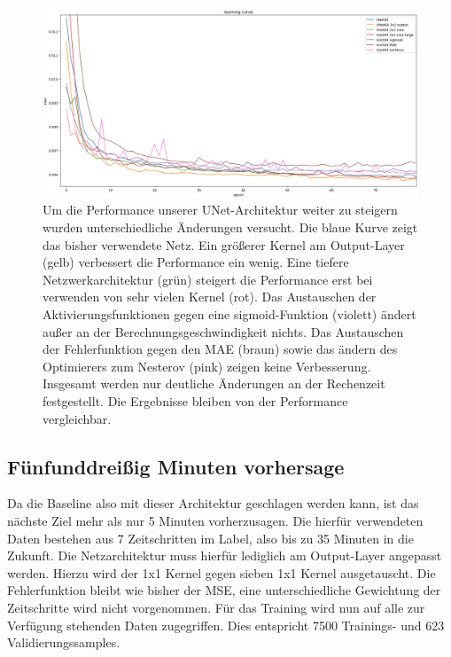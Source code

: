 \begin{figure}[h]
	\centering
	\includegraphics[width=\linewidth]{pics/vgl_lc_optim.png}
	\caption[Verschiedene UNet optimierungen im Vergleich.]{
		Um die Performance unserer UNet-Architektur weiter zu steigern wurden unterschiedliche Änderungen versucht. Die blaue Kurve zeigt das bisher verwendete Netz. Ein größerer Kernel am Output-Layer (gelb) verbessert die Performance ein wenig. Eine tiefere Netzwerkarchitektur (grün) steigert die Performance erst bei verwenden von sehr vielen Kernel (rot). Das Austauschen der Aktivierungsfunktionen gegen eine sigmoid-Funktion (violett) ändert außer an der Berechnungsgeschwindigkeit nichts. Das Austauschen der Fehlerfunktion gegen den MAE (braun) sowie das ändern des Optimierers zum Nesterov (pink) zeigen keine Verbesserung. Insgesamt werden nur deutliche Änderungen an der Rechenzeit festgestellt. Die Ergebnisse bleiben von der Performance vergleichbar.
		}
	\label{lc_unet_types}
\end{figure}

\subsection{Fünfunddreißig Minuten vorhersage}
Da die Baseline also mit dieser Architektur geschlagen werden kann, ist das nächste Ziel mehr als nur 5 Minuten vorherzusagen. Die hierfür verwendeten Daten bestehen aus 7 Zeitschritten im Label, also bis zu 35 Minuten in die Zukunft. Die Netzarchitektur muss hierfür lediglich am Output-Layer angepasst werden. Hierzu wird der 1x1 Kernel gegen sieben 1x1 Kernel ausgetauscht. Die Fehlerfunktion bleibt wie bisher der MSE, eine unterschiedliche Gewichtung der Zeitschritte wird nicht vorgenommen.
Für das Training wird nun auf alle zur Verfügung stehenden Daten zugegriffen. Dies entspricht 7500 Trainings- und 623 Validierungssamples.

